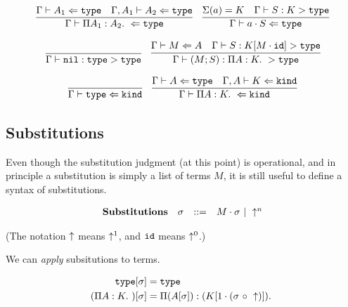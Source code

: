 \documentclass[11pt,twoside]{article}
\begin{document}
\bigskip 
{}
\bigskip 

$$
\begin{array}{cc}
\infer{\CheckTy{\PiTyp{A_1}{A_2}}{\Type}}{\CheckTy{A_1}{\Type} & \CheckTy[\Gamma,A_1]{A_2}{\Type}} &
\infer{\CheckTy{a\cdot S}{\Type}}{\Sigma(a) = K & \Focus{S}{K}{\Type}}
\end{array} 
$$

\bigskip 
{}
\bigskip 

$$
\begin{array}{lr}
\infer{\Focus{\Nil}{\Type}{\Type}}{} & 
\infer{\Focus{(M;S)}{\PiTyp{A}{K}}{\Type}}{\CheckTy{M}{A} & \Focus{S}{K[M\cdot\IdSub]}{\Type}}
\end{array} 
$$

\bigskip 
{}
\bigskip 

$$
\begin{array}{cc}
\infer{\CheckTy{\Type}{\Kind}}{} &
\infer{\CheckTy{\PiTyp{A}{K}}{\Kind}}{\CheckTy{A}{\Type} & \CheckTy[\Gamma,A]{K}{\Kind}}
\end{array} 
$$


\subsection{Substitutions}

Even though the substitution judgment (at this point) is operational,
and in principle a substitution is simply a list of terms $M$,
it is still useful to define a syntax of substitutions.  

\newcommand{\Msub}{[\sigma]}
\newcommand{\Ssub}{[1\cdot(\sigma\Comp\Shift)]}

$$
\begin{array}{llll}
\mathbf{Substitutions} & \sigma & ::= & M\cdot\sigma \ |\  \uparrow^n \\
\end{array} 
$$

(The notation $\uparrow$ means $\uparrow^1$, and $\mathtt{id}$ means $\uparrow^0$.)  

We can \emph{apply} subsitutions to terms.

\bigskip
\framebox{$K\Msub = K'$}

\begin{align*} 
\Type\Msub &= \Type \\
(\PiTyp{A}{K})\Msub &= \PiTyp{(A\Msub)}{(K\Ssub)}\\
\end{align*} 
\end{document}
